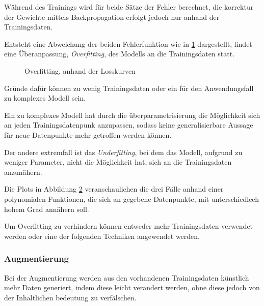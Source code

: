 Während des Trainings wird für beide Sätze der Fehler berechnet, 
die korrektur der Gewichte mittels Backpropagation erfolgt
jedoch nur anhand der Trainingsdaten.

Entsteht eine Abweichung der beiden Fehlerfunktion wie in 
\ref{fig:overfitting} dargestellt, findet eine Überanpassung, 
\textit{Overfitting}, des Modells an die Trainingsdaten statt.

\vspace{1cm}
\begin{figure}[H]
    \centering
    \def\svgwidth{0.5\textwidth}
    
    \caption{Overfitting, anhand der Losskurven}
    \label{fig:overfitting}
\end{figure}
\vspace{1cm}

Gründe dafür können zu wenig 
Trainingsdaten oder ein für den Anwendungsfall 
zu komplexes Modell sein.
 
Ein zu komplexes Modell hat durch die überparametrisierung
die Möglichkeit sich an jeden Trainingsdatenpunk 
anzupassen, sodass keine generalisierbare 
Aussage für neue Datenpunkte mehr getroffen werden können.

Der andere extremfall ist das \textit{Underfitting}, 
bei dem das Modell, aufgrund zu weniger Parameter, nicht die 
Möglichkeit hat, sich an die Trainingsdaten anzunähern.

Die Plots in Abbildung \ref{fig:over_under_fit} veranschaulichen 
die drei Fälle anhand einer polynomialen Funktionen,
die sich an gegebene Datenpunkte, mit unterschiedlech hohem 
Grad annähern soll.

\vspace{1cm}
\begin{figure}[H]
    \centering
    \def\svgwidth{0.95\textwidth}
    
    \caption{}
    \label{fig:over_under_fit}
\end{figure}
\vspace{1cm}


Um Overfitting zu verhindern können entweder mehr Trainingsdaten 
verwendet werden oder eine der folgenden Techniken angewendet werden.

\subsubsection{Augmentierung}
Bei der Augmentierung werden aus den vorhandenen Trainingsdaten
künstlich mehr Daten generiert, 
indem diese leicht verändert werden, ohne 
diese jedoch von der Inhaltlichen bedeutung zu verfälschen.


